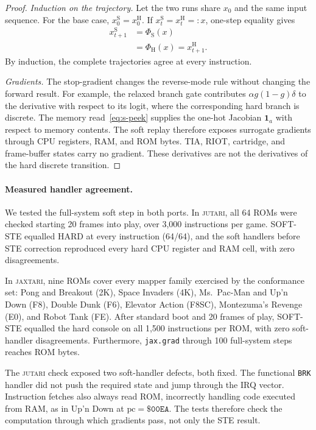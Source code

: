 \documentclass[letterpaper]{article} %
\begin{document}
\begin{proof}
\textit{Induction on the trajectory.}
Let the two runs share $x_0$ and the same input
sequence. For the base case,
$x^{\mathrm{S}}_0=x^{\mathrm{H}}_0$.
If $x^{\mathrm{S}}_t=x^{\mathrm{H}}_t=:x$,
one-step equality gives
\begin{equation}
\begin{aligned}
x^{\mathrm{S}}_{t+1}
&=\Phi_{\mathrm{S}}(x)\\
&=\Phi_{\mathrm{H}}(x)
=x^{\mathrm{H}}_{t+1}.
\end{aligned}
\end{equation}
By induction, the complete trajectories agree at
every instruction.

\textit{Gradients.}
The stop-gradient changes the reverse-mode rule
without changing the forward result. For example,
the relaxed branch gate contributes
$\alpha g(1-g)\delta$ to the derivative with
respect to its logit, where the corresponding
hard branch is discrete. The memory
read~\eqref{eq:s-peek} supplies the one-hot
Jacobian $\mathbf{1}_a$ with respect to memory
contents. The soft replay therefore exposes
surrogate gradients through CPU registers, RAM,
and ROM bytes. TIA, RIOT, cartridge, and
frame-buffer states carry no gradient.
These derivatives are not the derivatives of
the hard discrete transition.
\end{proof}

\paragraph{Measured handler agreement.}
We tested the full-system soft step in both ports.
In \textsc{jutari}, all 64 ROMs were checked
starting 20 frames into play, over 3,000 instructions
per game. SOFT-STE equalled HARD at every instruction
(64/64), and the soft handlers before STE correction
reproduced every hard CPU register and RAM cell,
with zero disagreements.

In \textsc{jaxtari}, nine ROMs cover every mapper
family exercised by the conformance set:
Pong and Breakout (2K), Space Invaders (4K),
Ms.\ Pac-Man and Up'n Down (F8), Double Dunk (F6),
Elevator Action (F8SC), Montezuma's Revenge (E0),
and Robot Tank (FE). After standard boot and
20 frames of play, SOFT-STE equalled the hard
console on all 1,500 instructions per ROM,
with zero soft-handler disagreements.
Furthermore, \texttt{jax.grad} through 100
full-system steps reaches ROM bytes.

The \textsc{jutari} check exposed two soft-handler
defects, both fixed. The functional \texttt{BRK}
handler did not push the required state and jump
through the IRQ vector. Instruction fetches also
always read ROM, incorrectly handling code executed
from RAM, as in Up'n Down at
$\mathrm{pc}=\texttt{\$00EA}$.
The tests therefore check the computation through
which gradients pass, not only the STE result.
\end{document}
